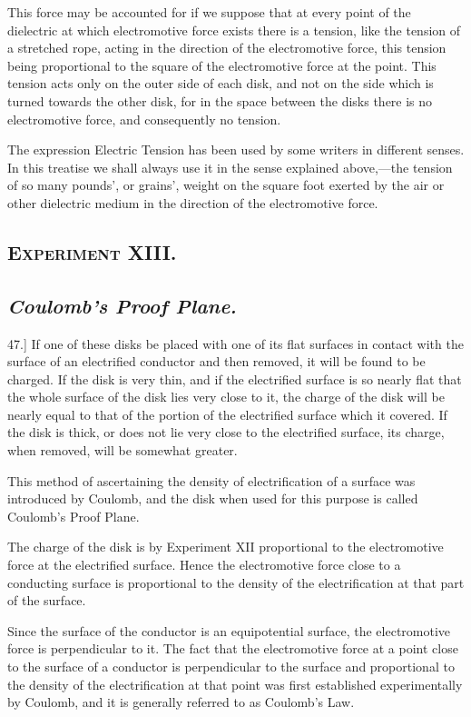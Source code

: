 \documentclass[12pt,oneside]{book}[2021/10/04]
\newcommand{\Heading}{\centering\normalfont}
\newcommand{\Section}[1]{\subsection*{\normalsize\Heading\scshape #1}}
\newcommand{\Subsection}[1]{\subsection*{\normalsize\Heading\itshape #1}}
\newcommand{\Runhead}[1]{\fancyhead[C]{\iffloatpage{}{\small#1}}}
\newcommand{\article}[1]{\phantomsection \label{art:#1}{#1.]}}
\newcommand{\¬}{\hphantom{0}}
\begin{document}
This force may be accounted for if we suppose that at every
point of the dielectric at which electromotive force exists there is
a tension, like the tension of a stretched rope, acting in the direction
of the electromotive force, this tension being proportional to
the square of the electromotive force at the point. This tension
acts only on the outer side of each disk, and not on the side which
is turned towards the other disk, for in the space between the disks
there is no electromotive force, and consequently no tension.

The expression Electric Tension has been used by some writers
in different senses. In this treatise we shall always use it in the
sense explained above,---the tension of so many pounds', or grains',
weight on the square foot exerted by the air or other dielectric
medium in the direction of the electromotive force.
\Runhead{ELECTRIC TENSION.}

\Section{Experiment XIII.}

\Subsection{Coulomb's Proof Plane.}

\article{47} If one of these disks be placed with one of its flat surfaces
in contact with the surface of an electrified conductor and
then removed, it will be found to be charged. If the disk is
very thin, and if the electrified surface is so nearly flat that the
whole surface of the disk lies very close to it, the charge of the disk
will be nearly equal to that of the portion of the electrified surface
which it covered. If the disk is thick, or does not lie very close to
the electrified surface, its charge, when removed, will be somewhat
greater.

This method of ascertaining the density of electrification of a
surface was introduced by Coulomb, and the disk when used for
this purpose is called Coulomb's Proof Plane.
\Runhead{COULOMB'S PROOF PLANE.}

The charge of the disk is by Experiment XII proportional to the
electromotive force at the electrified surface. Hence the electromotive
force close to a conducting surface is proportional to the
density of the electrification at that part of the surface.

Since the surface of the conductor is an equipotential surface, the
electromotive force is perpendicular to it. The fact that the electromotive
force at a point close to the surface of a conductor is
perpendicular to the surface and proportional to the density of the
electrification at that point was first established experimentally by
Coulomb, and it is generally referred to as Coulomb's Law.
\end{document}
